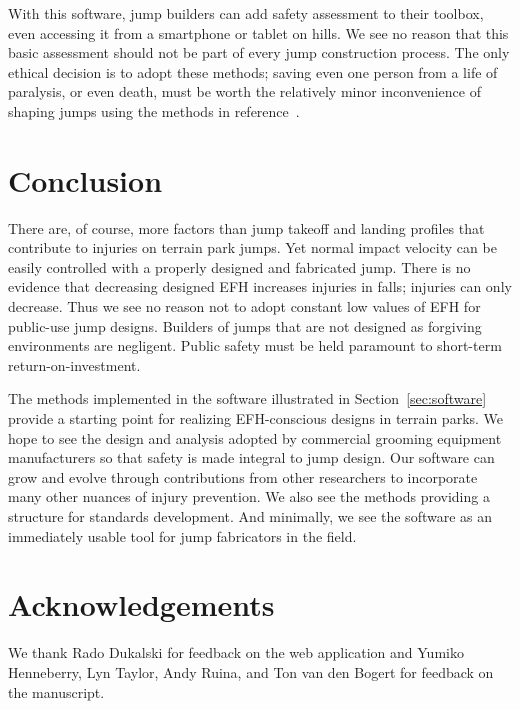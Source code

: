 \documentclass{article}
\begin{document}
With this software, jump builders can add safety assessment to their toolbox,
even accessing it from a smartphone or tablet on hills.  We see no reason that
this basic assessment should not be part of every jump construction process.
The only ethical decision is to adopt these methods; saving even one person
from a life of paralysis, or even death, must be worth the relatively minor
inconvenience of shaping jumps using the methods in reference~\cite{Levy2015}.

\section{Conclusion}
\label{sec:conc}
%
There are, of course, more factors than jump takeoff and landing profiles that
contribute to injuries on terrain park jumps. Yet normal impact velocity can be
easily controlled with a properly designed and fabricated jump. There is no
evidence that decreasing designed EFH increases injuries in falls; injuries can
only decrease. Thus we see no reason not to adopt constant low values of EFH
for public-use jump designs. Builders of jumps that are not designed as
forgiving environments are negligent. Public safety must be held paramount to
short-term return-on-investment.

The methods implemented in the software illustrated in
Section~\ref{sec:software} provide a starting point for realizing EFH-conscious
designs in terrain parks. We hope to see the design and analysis adopted by
commercial grooming equipment manufacturers so that safety is made integral to
jump design. Our software can grow and evolve through contributions from other
researchers to incorporate many other nuances of injury prevention. We also see
the methods providing a structure for standards development. And minimally, we
see the software as an immediately usable tool for jump fabricators in the
field.

\section*{Acknowledgements}
We thank Rado Dukalski for feedback on the web application and Yumiko
Henneberry, Lyn Taylor, Andy Ruina, and Ton van den Bogert for feedback on the
manuscript.
\end{document}
